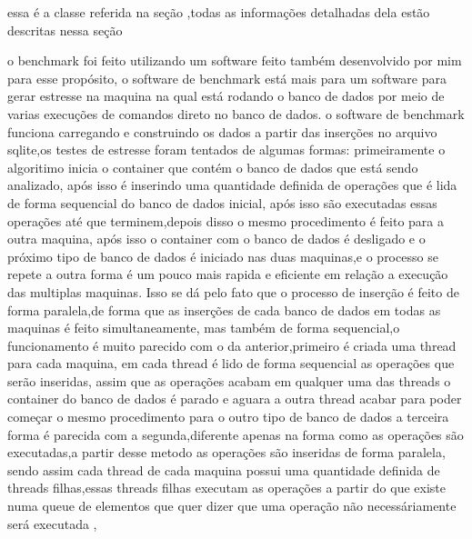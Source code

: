\documentclass[
	12pt,				%
	openright,			%
	oneside,			%
	a4paper,			%
	english,			%
	french,				%
	spanish,			%
	brazil,				%
	]{abntex2}
\begin{document}
essa é a classe referida na seção ,todas as informações detalhadas dela estão descritas nessa seção

o benchmark foi feito utilizando um software feito também desenvolvido por mim para esse propósito,
o software de benchmark está mais para um software para gerar estresse na maquina na qual está rodando o banco de dados por meio de varias execuções de comandos direto no banco de dados.
o software de benchmark funciona carregando e construindo os dados a partir das inserções no arquivo sqlite,os testes de estresse foram tentados de algumas formas:\newline
primeiramente o algoritimo inicia o container que contém o banco de dados que está sendo analizado,
após isso é inserindo uma quantidade definida de operações que é lida de forma sequencial do banco de dados inicial,
após isso são executadas essas operações até que terminem,depois disso o mesmo procedimento é feito para a outra maquina,
após isso o container com o banco de dados é desligado e o próximo tipo de banco de dados é iniciado nas duas maquinas,e o processo se repete\newline
a outra forma é um pouco mais rapida e eficiente em relação a execução das multiplas maquinas.
Isso se dá pelo fato que o processo de inserção é feito de forma paralela,de forma que as inserções de cada banco de dados em todas as maquinas é feito simultaneamente,
mas também de forma sequencial,o funcionamento é muito parecido com o da anterior,primeiro é criada uma thread para cada maquina,
em cada thread é lido de forma sequencial as operações que serão inseridas,
assim que as operações acabam em qualquer uma das threads o container do banco de dados é parado e aguara a outra thread acabar para poder começar o mesmo procedimento para o outro tipo de banco de dados\newline
a terceira forma é parecida com a segunda,diferente apenas na forma como as operações são executadas,a partir desse metodo as operações são inseridas de forma paralela,
sendo assim cada thread de cada maquina possui uma quantidade definida de threads filhas,essas threads filhas executam as operações a partir do que existe numa queue de elementos que quer dizer que uma operação não necessáriamente será executada ,
\end{document}
